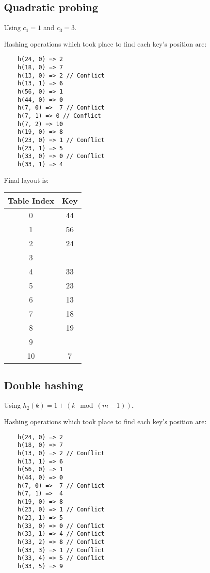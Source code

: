 \documentclass[a4paper]{scrartcl}
\begin{document}
\subsection{Quadratic probing}

Using $c_1 = 1$ and $c_3 = 3$.

Hashing operations which took place to find each key's position are:

\begin{lstlisting}
	h(24, 0) => 2
	h(18, 0) => 7
	h(13, 0) => 2 // Conflict
	h(13, 1) => 6
	h(56, 0) => 1
	h(44, 0) => 0
	h(7, 0) =>  7 // Conflict
	h(7, 1) => 0 // Conflict
	h(7, 2) => 10
	h(19, 0) => 8
	h(23, 0) => 1 // Conflict
	h(23, 1) => 5
	h(33, 0) => 0 // Conflict
	h(33, 1) => 4
\end{lstlisting}

Final layout is:

\begin{tabular}{|c|c|}
	\hline
	Table Index & Key \\
	\hline
	0 & 44 \\
	1 & 56 \\
	2 & 24 \\
	3 & \\
	4 & 33 \\
	5 & 23 \\
	6 & 13 \\
	7 & 18 \\
	8 & 19 \\
	9 & \\
	10 & 7 \\
	\hline
\end{tabular}

\subsection{Double hashing}

Using $h_2(k) = 1 + (k \mod (m - 1))$.

Hashing operations which took place to find each key's position are:

\begin{lstlisting}
	h(24, 0) => 2
	h(18, 0) => 7
	h(13, 0) => 2 // Conflict
	h(13, 1) => 6
	h(56, 0) => 1
	h(44, 0) => 0
	h(7, 0) =>  7 // Conflict
	h(7, 1) =>  4
	h(19, 0) => 8
	h(23, 0) => 1 // Conflict
	h(23, 1) => 5
	h(33, 0) => 0 // Conflict
	h(33, 1) => 4 // Conflict
	h(33, 2) => 8 // Conflict
	h(33, 3) => 1 // Conflict
	h(33, 4) => 5 // Conflict
	h(33, 5) => 9
\end{lstlisting}
\end{document}
